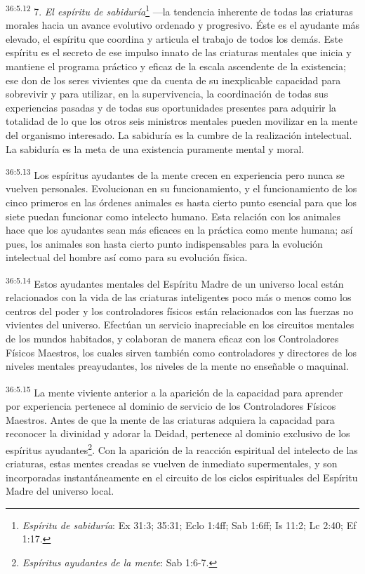 \par
\textsuperscript{36:5.12} 7. \textit{El espíritu de sabiduría}\footnote{\textit{Espíritu de sabiduría}: Ex 31:3; 35:31; Eclo 1:4ff; Sab 1:6ff; Is 11:2; Lc 2:40; Ef 1:17.} ---la tendencia inherente de todas las criaturas morales hacia un avance evolutivo ordenado y progresivo. Éste es el ayudante más elevado, el espíritu que coordina y articula el trabajo de todos los demás. Este espíritu es el secreto de ese impulso innato de las criaturas mentales que inicia y mantiene el programa práctico y eficaz de la escala ascendente de la existencia; ese don de los seres vivientes que da cuenta de su inexplicable capacidad para sobrevivir y para utilizar, en la supervivencia, la coordinación de todas sus experiencias pasadas y de todas sus oportunidades presentes para adquirir la totalidad de lo que los otros seis ministros mentales pueden movilizar en la mente del organismo interesado. La sabiduría es la cumbre de la realización intelectual. La sabiduría es la meta de una existencia puramente mental y moral.

\par
\textsuperscript{36:5.13} Los espíritus ayudantes de la mente crecen en experiencia pero nunca se vuelven personales. Evolucionan en su funcionamiento, y el funcionamiento de los cinco primeros en las órdenes animales es hasta cierto punto esencial para que los siete puedan funcionar como intelecto humano. Esta relación con los animales hace que los ayudantes sean más eficaces en la práctica como mente humana; así pues, los animales son hasta cierto punto indispensables para la evolución intelectual del hombre así como para su evolución física.

\par
\textsuperscript{36:5.14} Estos ayudantes mentales del Espíritu Madre de un universo local están relacionados con la vida de las criaturas inteligentes poco más o menos como los centros del poder y los controladores físicos están relacionados con las fuerzas no vivientes del universo. Efectúan un servicio inapreciable en los circuitos mentales de los mundos habitados, y colaboran de manera eficaz con los Controladores Físicos Maestros, los cuales sirven también como controladores y directores de los niveles mentales preayudantes, los niveles de la mente no enseñable o maquinal.

\par
\textsuperscript{36:5.15} La mente viviente anterior a la aparición de la capacidad para aprender por experiencia pertenece al dominio de servicio de los Controladores Físicos Maestros. Antes de que la mente de las criaturas adquiera la capacidad para reconocer la divinidad y adorar la Deidad, pertenece al dominio exclusivo de los espíritus ayudantes\footnote{\textit{Espíritus ayudantes de la mente}: Sab 1:6-7.}. Con la aparición de la reacción espiritual del intelecto de las criaturas, estas mentes creadas se vuelven de inmediato supermentales, y son incorporadas instantáneamente en el circuito de los ciclos espirituales del Espíritu Madre del universo local.

